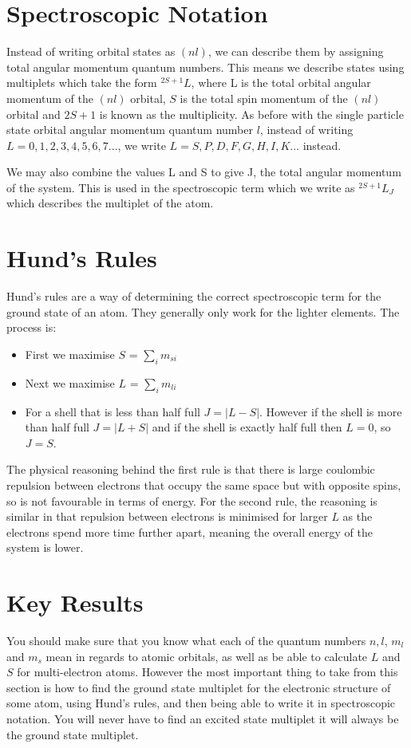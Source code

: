 \section{Spectroscopic Notation}

Instead of writing orbital states as $(nl)$, we can describe them by assigning total angular momentum quantum numbers. This means we describe states using multiplets which take the form $^{2S + 1}L$, where L is the total orbital angular momentum of the $(nl)$ orbital, $S$ is the total spin momentum of the $(nl)$ orbital and $2S + 1$ is known as the multiplicity. As before with the single particle state orbital angular momentum quantum number $l$, instead of writing $L = 0, 1, 2, 3, 4, 5, 6, 7 ...$, we write $L = S, P, D, F, G, H, I, K ...$ instead.

\noindent We may also combine the values L and S to give J, the total angular momentum of the system. This is used in the spectroscopic term which we write as $^{2S + 1}L_J$ which describes the multiplet of the atom.

\section{Hund's Rules}

Hund's rules are a way of determining the correct spectroscopic term for the ground state of an atom. They generally only work for the lighter elements. The process is:

\begin{itemize}
    \item First we maximise $S$ = $\sum_i m_{si}$
    \item Next we maximise $L$ = $\sum_i m_{li}$
    \item For a shell that is less than half full $J = |L - S|$. However if the shell is more than half full $J = |L + S|$ and if the shell is exactly half full then $L = 0$, so $J = S$.
\end{itemize}

\noindent The physical reasoning behind the first rule is that there is large coulombic repulsion between electrons that occupy the same space but with opposite spins, so is not favourable in terms of energy. For the second rule, the reasoning is similar in that repulsion between electrons is minimised for larger $L$ as the electrons spend more time further apart, meaning the overall energy of the system is lower.



\section{Key Results}

You should make sure that you know what each of the quantum numbers $n, l$, $m_l$ and $m_s$ mean in regards to atomic orbitals, as well as be able to calculate $L$ and $S$ for multi-electron atoms. However the most important thing to take from this section is how to find the ground state multiplet for the electronic structure of some atom, using Hund's rules, and then being able to write it in spectroscopic notation. You will never have to find an excited state multiplet it will always be the ground state multiplet.
